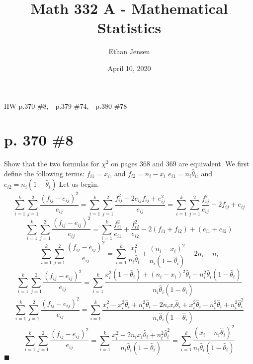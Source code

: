 \documentclass[12pt]{article}
\title{Math 332 A - Mathematical Statistics}
\author{Ethan Jensen}
\date{April 10, 2020}
\begin{document}
	\maketitle HW p.370 \#8,\ \ p.379 \#74,\ \ p.380 \#78
	\section[20pt]{p. 370 \#8}
	Show that the two formulas for \(\chi^2\) on pages 368 and 369 are equivalent.
	\newline
	\newline
	We first define the following terms:
	\newline
	\(f_{i1} = x_i\), and \(f_{i2} = n_i - x_i\)
	\newline
	\(e_{i1} = n_i\hat{\theta}_i\), and \(e_{i2} = n_i(1-\hat{\theta}_i)\)
	\newline
	\newline
	Let us begin.
	\[\sum_{i=1}^k\sum_{j=1}^2\frac{(f_{ij}-e_{ij})^2}{e_{ij}} = \sum_{i=1}^k\sum_{j=1}^2\frac{f_{ij}^2-2e_{ij}f_{ij}+e_{ij}^2}{e_{ij}} = \sum_{i=1}^k\sum_{j=1}^2\frac{f_{ij}^2}{e_{ij}} -2f_{ij} +e_{ij}\]
	\[\sum_{i=1}^k\sum_{j=1}^2\frac{(f_{ij}-e_{ij})^2}{e_{ij}} = \sum_{i=1}^k\frac{f_{i1}^2}{e_{i1}} + \frac{f_{i2}^2}{e_{i2}} - 2(f_{i1} + f_{i2}) +(e_{i1} + e_{i2})\]
	\[\sum_{i=1}^k\sum_{j=1}^2\frac{(f_{ij}-e_{ij})^2}{e_{ij}} = \sum_{i=1}^k\frac{x_i^2}{n_i\hat{\theta}_i}+\frac{(n_i-x_i)^2}{n_i(1-\hat{\theta}_i)}-2n_i + n_i\]
	\[\sum_{i=1}^k\sum_{j=1}^2\frac{(f_{ij}-e_{ij})^2}{e_{ij}} = \sum_{i=1}^k\frac{x_i^2(1-\hat{\theta}_i) + (n_i-x_i)^2\hat{\theta}_i-n_i^2\hat{\theta}_i(1-\hat{\theta}_i)}{n_i\hat{\theta}_i(1-\hat{\theta}_i)}\]
	\[\sum_{i=1}^k\sum_{j=1}^2\frac{(f_{ij}-e_{ij})^2}{e_{ij}} = \sum_{i=1}^k\frac{x_i^2 - x_i^2\hat{\theta}_i + n_i^2\hat{\theta}_i - 2n_ix_i\hat{\theta}_i + x_i^2\hat{\theta}_i - n_i^2\hat{\theta}_i + n_i^2\hat{\theta}_i^2}{n_i\hat{\theta}_i(1-\hat{\theta}_i)}\]
	\[\sum_{i=1}^k\sum_{j=1}^2\frac{(f_{ij}-e_{ij})^2}{e_{ij}} = \sum_{i=1}^k\frac{x_i^2 - 2n_ix_i\hat{\theta}_i + n_i^2\hat{\theta}_i^2}{n_i\hat{\theta}_i(1-\hat{\theta}_i)} = \sum_{i=1}^k\frac{(x_i-n_i\hat{\theta}_i)^2}{n_i\hat{\theta}_i(1-\hat{\theta}_i)}\]
	\newline \(\blacksquare\)
	\newpage
\end{document}
